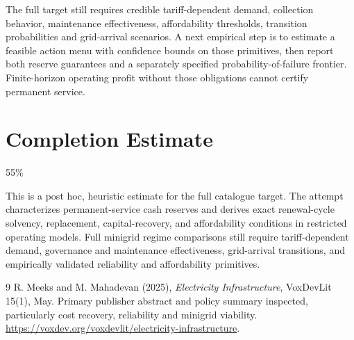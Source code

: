 \documentclass[11pt]{article}
\begin{document}
The full target still requires credible tariff-dependent demand,
collection behavior, maintenance effectiveness, affordability thresholds,
transition probabilities and grid-arrival scenarios. A next empirical
step is to estimate a feasible action menu with confidence bounds on those
primitives, then report both reserve guarantees and a separately specified
probability-of-failure frontier. Finite-horizon operating profit without
those obligations cannot certify permanent service.

\section{Completion Estimate}
55\%

This is a post hoc, heuristic estimate for the full catalogue target.
The attempt characterizes permanent-service cash reserves and derives exact renewal-cycle solvency, replacement, capital-recovery, and affordability conditions in restricted operating models. Full minigrid regime comparisons still require tariff-dependent demand, governance and maintenance effectiveness, grid-arrival transitions, and empirically validated reliability and affordability primitives.

\begin{thebibliography}{9}
 R. Meeks and M. Mahadevan (2025), \emph{Electricity
Infrastructure}, VoxDevLit 15(1), May. Primary publisher abstract and
policy summary inspected, particularly cost recovery, reliability and
minigrid viability. \url{https://voxdev.org/voxdevlit/electricity-infrastructure}.
\end{thebibliography}
\end{document}
